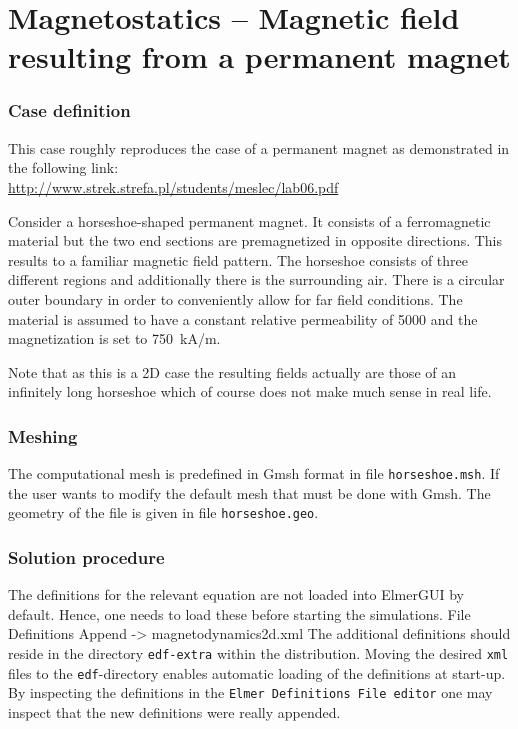 \chapter{Magnetostatics -- Magnetic field resulting from a permanent magnet}




\subsection*{Case definition}

This case roughly reproduces the case of a permanent magnet as demonstrated in 
the following link: \\
\url{http://www.strek.strefa.pl/students/meslec/lab06.pdf}

Consider a horseshoe-shaped permanent magnet. It consists of a ferromagnetic material but the two end 
sections are premagnetized in opposite directions. This results to a familiar magnetic field pattern.
The horseshoe consists of three different regions and additionally there is the surrounding air.
There is a circular outer boundary in order to conveniently allow for far field conditions.  
The material is assumed to have a constant relative permeability of 5000 and the magnetization is 
set to 750~kA/m. 

Note that as this is a 2D case the resulting fields actually are those of an infinitely long 
horseshoe which of course does not make much sense in real life. 


\subsection*{Meshing}

The computational mesh is predefined in Gmsh format in file \texttt{horseshoe.msh}. 
If the user wants to modify the default mesh that must be done with Gmsh. The geometry of 
the file is given in file \texttt{horseshoe.geo}.


\subsection*{Solution procedure}

The definitions for the relevant equation are not loaded into ElmerGUI by default. Hence, 
one needs to load these before starting the simulations.
\ttbegin
File 
  Definitions
    Append -> magnetodynamics2d.xml
\ttend
The additional definitions should reside in the directory \texttt{edf-extra} within the distribution.
Moving the desired \texttt{xml} files to the \texttt{edf}-directory enables automatic loading of the 
definitions at start-up. By inspecting the definitions in the \texttt{Elmer Definitions File editor} one
may inspect that the new definitions were really appended. 

